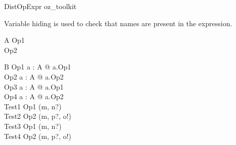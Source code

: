 \begin{zsection}
  \SECTION DistOpExpr \parents oz\_toolkit
\end{zsection}

Variable hiding is used to check that names are present in the
expression. 

\begin{class}{A}  
  Op1 \\
  Op2 \\
\end{class}

\begin{class}{B}
  Op1 \sdef \dcnj a : A @ a.Op1\\
  Op2 \sdef \dcnj a : A @ a.Op2\\
  Op3 \sdef \dsqc a : A @ a.Op1\\
  Op4 \sdef \dsqc a : A @ a.Op2\\
  Test1 \sdef Op1 \hide (m, n?)\\
  Test2 \sdef Op2 \hide (m, p?, o!)\\
  Test3 \sdef Op1 \hide (m, n?)\\
  Test4 \sdef Op2 \hide (m, p?, o!)\\
\end{class}

